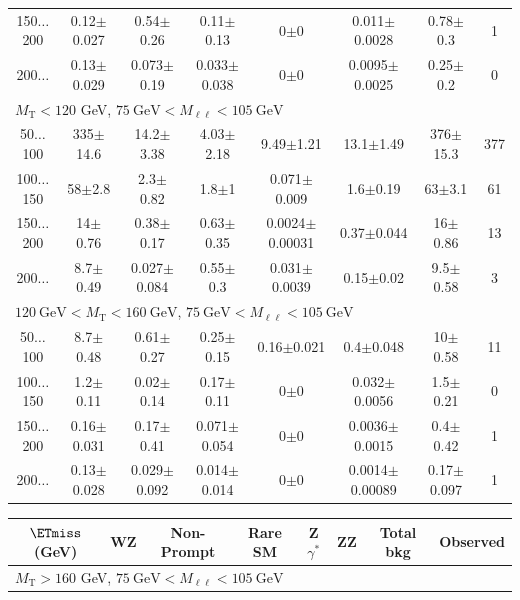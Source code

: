 \begin{landscape}
\begin{table}
\begin{center}
\begin{tabular}{| c | c c c c c c c | }
150$\dots$200&0.12$\pm$0.027&0.54$\pm$0.26&0.11$\pm$0.13&0$\pm$0&0.011$\pm$0.0028&0.78$\pm$0.3&1\\
200$\dots$&0.13$\pm$0.029&0.073$\pm$0.19&0.033$\pm$0.038&0$\pm$0&0.0095$\pm$0.0025&0.25$\pm$0.2&0\\
\hline\hline
\multicolumn{8}{l}{$M_{\text{T}} < 120$ GeV, $75~\mathrm{GeV} < M_{\ell\ell} < 105~\mathrm{GeV}$}\\\hline\hline
50$\dots$100&335$\pm$14.6&14.2$\pm$3.38&4.03$\pm$2.18&9.49$\pm$1.21&13.1$\pm$1.49&376$\pm$15.3&377\\
100$\dots$150&58$\pm$2.8&2.3$\pm$0.82&1.8$\pm$1&0.071$\pm$0.009&1.6$\pm$0.19&63$\pm$3.1&61\\
150$\dots$200&14$\pm$0.76&0.38$\pm$0.17&0.63$\pm$0.35&0.0024$\pm$0.00031&0.37$\pm$0.044&16$\pm$0.86&13\\
200$\dots$&8.7$\pm$0.49&0.027$\pm$0.084&0.55$\pm$0.3&0.031$\pm$0.0039&0.15$\pm$0.02&9.5$\pm$0.58&3\\
\hline\hline
\multicolumn{8}{l}{$120~\mathrm{GeV} < M_{\text{T}} < 160~\mathrm{GeV}$, $75~\mathrm{GeV} < M_{\ell\ell} < 105~\mathrm{GeV}$}\\\hline\hline
50$\dots$100&8.7$\pm$0.48&0.61$\pm$0.27&0.25$\pm$0.15&0.16$\pm$0.021&0.4$\pm$0.048&10$\pm$0.58&11\\
100$\dots$150&1.2$\pm$0.11&0.02$\pm$0.14&0.17$\pm$0.11&0$\pm$0&0.032$\pm$0.0056&1.5$\pm$0.21&0\\
150$\dots$200&0.16$\pm$0.031&0.17$\pm$0.41&0.071$\pm$0.054&0$\pm$0&0.0036$\pm$0.0015&0.4$\pm$0.42&1\\
200$\dots$&0.13$\pm$0.028&0.029$\pm$0.092&0.014$\pm$0.014&0$\pm$0&0.0014$\pm$0.00089&0.17$\pm$0.097&1\\
\hline\hline
\end{tabular}
\end{center}
\end{table}
\begin{table}
\begin{center}
\begin{tabular}{| c | c c c c c c c | }\hline\hline
$\ETmiss$ (GeV) & WZ & Non-Prompt & Rare SM & Z$\gamma^*$ & ZZ & Total bkg & Observed\\\hline\hline
\multicolumn{8}{l}{$M_{\text{T}} > 160$ GeV, $75~\mathrm{GeV} < M_{\ell\ell} < 105~\mathrm{GeV}$}\\\hline\hline

\end{tabular}
\end{center}
\end{table}
\end{landscape}
